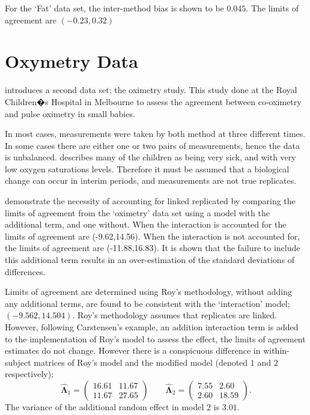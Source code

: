 \documentclass[12pt, a4paper]{report}
\theoremstyle{plain}
\theoremstyle{definition}
\theoremstyle{remark}
\begin{document}
	For the `Fat' data set, the inter-method bias is shown to be $0.045$. The limits of agreement are $(-0.23 , 0.32)$
	
	\section{Oxymetry Data}	
	\citet{BXC2008} introduces a second data set; the oximetry study. This study done at the Royal Children�s Hospital in
	Melbourne to assess the agreement between co-oximetry and pulse oximetry in small babies.

	
	In most cases, measurements were taken by both method at three different times. In some cases there are either one or two pairs of measurements, hence the data is unbalanced. \citet{BXC2008} describes many of the children as being very sick, and with very low oxygen saturations levels. Therefore it must be assumed that a biological change can occur in interim periods, and measurements are not true replicates.
	

	\citet{BXC2008} demonstrate the necessity of accounting for linked replicated by comparing the limits of agreement from the `oximetry' data set using a model with the additional term, and one without. When the interaction is accounted for the limits of agreement are (-9.62,14.56). When the interaction is not accounted for, the limits of agreement are (-11.88,16.83). It is shown that the failure to include this additional term results in an over-estimation of the standard deviations of differences.
	
Limits of agreement are determined using Roy's methodology, without adding any additional terms, are found to be consistent with the `interaction' model; $(-9.562, 14.504 )$. Roy's methodology assumes that replicates are linked. However, following Carstensen's example, an addition interaction term is added to the implementation of Roy's model to assess the effect, the limits of agreement estimates do not change. However there is a conspicuous difference in within-subject matrices of Roy's model and the modified model (denoted $1$ and $2$ respectively);
\begin{equation}
	\hat{\boldsymbol{\Lambda}}_{1}= \left(\begin{array}{cc}
		16.61 &	11.67\\
		11.67 & 27.65 \end{array}\right) \qquad
	\boldsymbol{\hat{\Lambda}}_{2}= \left( \begin{array}{cc}
		7.55 & 2.60 \\
		2.60 & 18.59 \end{array} \right). 
\end{equation}
	The variance of the additional random effect in model $2$ is $3.01$.
\end{document}
